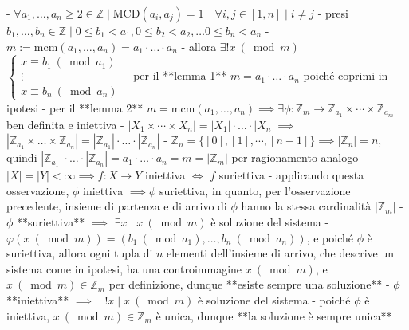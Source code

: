 - $\forall a_1, \ldots, a_n \ge 2 \in \mathbb{Z} \mid \textrm{MCD}(a_i, a_j) = 1 \quad \forall i, j \in [1, n] \mid i \neq j$
- presi \( b_1, \ldots, b_n \in \mathbb{Z} \mid 0 \leq b_{1}<a_{1}, 0 \leq b_{2}<a_{2}, \ldots 0 \leq b_n \lt a_n\)
- $m := \textrm{mcm}(a_1, \ldots, a_n) = a_1 \cdot \ldots \cdot a_n$
- allora $\exists ! x \ (\bmod m)$ \( \left\{\begin{array}{c}x \equiv b_{1}\ \left(\bmod a_{1}\right) \\ \vdots \\ x \equiv b_{n}\ \left(\bmod a_{n}\right)\end{array}\right. \)
  - per il **lemma 1** $m = a_1 \cdot \ldots \cdot a_n$ poiché coprimi in ipotesi
  - per il **lemma 2** $m = \textrm{mcm}(a_1, \ldots, a_n) \implies \exists \phi : \mathbb{Z}_m \rightarrow \mathbb{Z}_ {a_1} \times \cdots \times \mathbb{Z}_{a_m}$ ben definita e iniettiva
  - \( \left|X_{1} \times \cdots \times X_{n}\right|=\left|X_{1}\right| \cdot\ldots\cdot\left|X_{n}\right| \implies\) \( \left|\mathbb{Z}_{a_{1}} \times \ldots \times \mathbb{Z}_{a_{n}}\right|=\left|\mathbb{Z}_{a_{1}}\right| \cdot\ldots\cdot\left|\mathbb{Z}_{a_{n}}\right| \)
    - \( \mathbb{Z}_n = \{[0],[1], \cdots,[n-1]\} \implies \left|\mathbb{Z}_{n}\right|=n\), quindi \(\left|\mathbb{Z}_{a_{1}}\right| \cdot\ldots\cdot\left|\mathbb{Z}_{a_{n}}\right|  = a_1 \cdot \ldots \cdot a_n = m = \left| \mathbb{Z}_m \right|\) per ragionamento analogo
  - \( |X|=|Y|<\infty \implies f: X \rightarrow Y \) iniettiva $\iff$ $f$ suriettiva
    - applicando questa osservazione, $\phi$ iniettiva $\implies \phi$ suriettiva, in quanto, per l'osservazione precedente, insieme di partenza e di arrivo di $\phi$ hanno la stessa cardinalità $\left| \mathbb{Z}_m \right|$
  - $\phi$ **suriettiva** $\implies$ $\exists x \mid x \ (\bmod m)$ è soluzione del sistema
    - \( \varphi(x \ (\bmod m))=\left(b_{1}\ \left( \bmod  a_{1}\right), \ldots, b_{n} \ (\bmod a_{n})\right) \), e poiché $\phi$ è suriettiva, allora ogni tupla di $n$ elementi dell'insieme di arrivo, che descrive un sistema come in ipotesi, ha una controimmagine $x \ (\bmod m)$, e $x \ (\bmod m)\in \mathbb{Z}_m$ per definizione, dunque **esiste sempre una soluzione**
  - $\phi$ **iniettiva** $\implies$ $\exists ! x \mid x \ (\bmod m)$ è soluzione del sistema
    - poiché $\phi$ è iniettiva, $x \ (\bmod m) \in \mathbb{Z}_m$ è unica, dunque **la soluzione è sempre unica**
